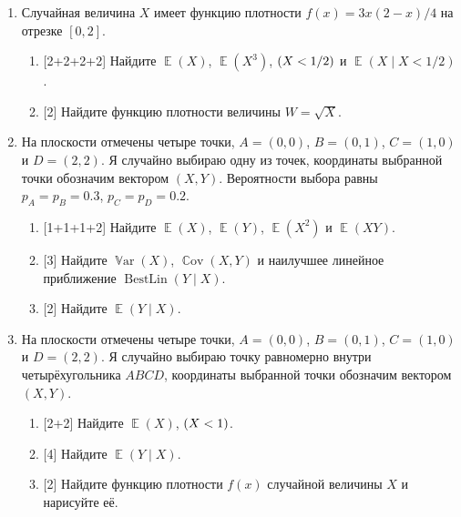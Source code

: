 \documentclass[12pt]{article}
\DeclareMathOperator{\Cov}{\mathbb{C}ov}
\DeclareMathOperator{\Var}{\mathbb{V}ar}
\DeclareMathOperator{\BestLin}{BestLin}
\let\P\relax
\DeclareMathOperator{\P}{\mathbb{P}}
\DeclareMathOperator{\E}{\mathbb{E}}
\begin{document}
{\begin{enumerate}
    \item %
    Случайная величина $X$ имеет функцию плотности $f(x) = 3x(2-x)/4$ на отрезке $[0, 2]$. 

    \begin{enumerate}
        \item {[2+2+2+2]} Найдите $\E(X)$, $\E(X^3)$, $\P(X < 1/2)$ и $\E(X \mid X < 1/2)$.
        \item {[2]} Найдите функцию плотности величины $W = \sqrt{X}$.
    \end{enumerate}

    \item %
    На плоскости отмечены четыре точки, $A = (0, 0)$, $B = (0, 1)$, $C = (1, 0)$ и $D = (2, 2)$.
Я случайно выбираю одну из точек, координаты выбранной точки обозначим вектором $(X, Y)$.
Вероятности выбора равны $p_A = p_B = 0.3$, $p_C = p_D = 0.2$.


\begin{enumerate}
    \item {[1+1+1+2]} Найдите $\E(X)$, $\E(Y)$, $\E(X^2)$ и $\E(XY)$.
    \item {[3]} Найдите $\Var(X)$, $\Cov(X, Y)$ и наилучшее линейное приближение $\BestLin(Y \mid X)$.
    \item {[2]} Найдите $\E(Y \mid X)$.
\end{enumerate}

\item     На плоскости отмечены четыре точки, $A = (0, 0)$, $B = (0, 1)$, $C = (1, 0)$ и $D = (2, 2)$.
Я случайно выбираю точку равномерно внутри четырёхугольника $ABCD$, координаты выбранной точки обозначим вектором $(X, Y)$.

\begin{enumerate}
    \item {[2+2]} Найдите $\E(X)$, $\P(X < 1)$.
    \item {[4]} Найдите $\E(Y \mid X)$.
    \item {[2]} Найдите функцию плотности $f(x)$ случайной величины $X$ и нарисуйте её. 
\end{enumerate}
\end{enumerate}
}

\thevariant

\newpage

\thevariant
\end{document}
